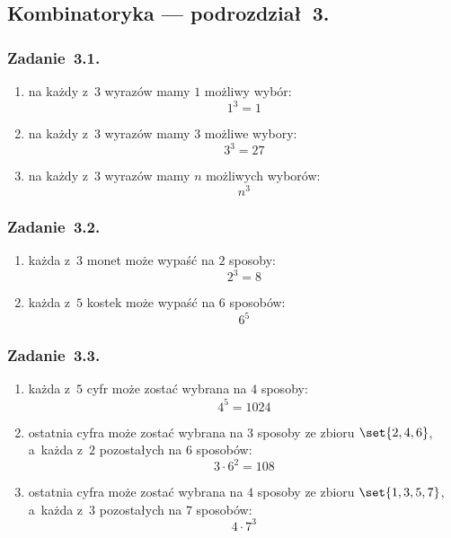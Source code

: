\subsection*{Kombinatoryka --- podrozdział~3.}
\subsubsection*{Zadanie~3.1.}
\begin{enumerate}[label={\alph*)}]
    \item na każdy z~\(3\) wyrazów mamy \(1\) możliwy wybór:
        \begin{equation*}
            1^3 = 1
        \end{equation*}
    \item na każdy z~\(3\) wyrazów mamy \(3\) możliwe wybory:
        \begin{equation*}
            3^3 = 27
        \end{equation*}
    \item na każdy z~\(3\) wyrazów mamy \(n\) możliwych wyborów:
        \begin{equation*}
            n^3
        \end{equation*}
\end{enumerate}
\subsubsection*{Zadanie~3.2.}
\begin{enumerate}[label={\alph*)}]
    \item każda z~\(3\) monet może wypaść na \(2\) sposoby:
        \begin{equation*}
            2^3 = 8
        \end{equation*}
    \item każda z~\(5\) kostek może wypaść na \(6\) sposobów:
        \begin{equation*}
            6^5
        \end{equation*}
\end{enumerate}
\subsubsection*{Zadanie~3.3.}
\begin{enumerate}[label={\alph*)}]
    \item każda z~\(5\) cyfr może zostać wybrana na \(4\) sposoby:
        \begin{equation*}
            4^5 = 1024
        \end{equation*}
    \item ostatnia cyfra może zostać wybrana na \(3\) sposoby ze zbioru \(\set{2, 4, 6}\), a~każda z~\(2\) pozostałych na \(6\) sposobów:
        \begin{equation*}
            3 \cdot 6^2 = 108
        \end{equation*}
    \item ostatnia cyfra może zostać wybrana na \(4\) sposoby ze zbioru \(\set{1, 3, 5, 7}\), a~każda z~\(3\) pozostałych na \(7\) sposobów:
        \begin{equation*}
            4 \cdot 7^3
        \end{equation*}
\end{enumerate}

